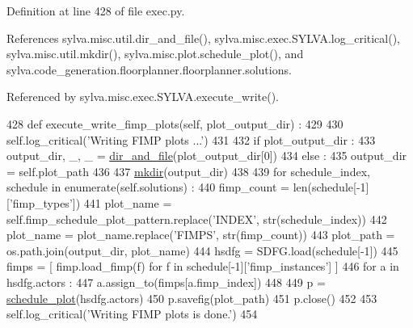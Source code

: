 Definition at line 428 of file exec.\+py.



References sylva.\+misc.\+util.\+dir\+\_\+and\+\_\+file(), sylva.\+misc.\+exec.\+S\+Y\+L\+V\+A.\+log\+\_\+critical(), sylva.\+misc.\+util.\+mkdir(), sylva.\+misc.\+plot.\+schedule\+\_\+plot(), and sylva.\+code\+\_\+generation.\+floorplanner.\+floorplanner.\+solutions.



Referenced by sylva.\+misc.\+exec.\+S\+Y\+L\+V\+A.\+execute\+\_\+write().


\begin{DoxyCode}
428   \textcolor{keyword}{def }execute\_write\_fimp\_plots(self, plot\_output\_dir) :
429 
430     self.log\_critical(\textcolor{stringliteral}{'Writing FIMP plots ...'})
431 
432     \textcolor{keywordflow}{if} plot\_output\_dir :
433       output\_dir, \_, \_ = \hyperlink{namespacesylva_1_1misc_1_1util_a0ce6d1d719234031353b60ac60f2af0d}{dir\_and\_file}(plot\_output\_dir[0])
434     \textcolor{keywordflow}{else} :
435       output\_dir = self.plot\_path
436 
437     \hyperlink{namespacesylva_1_1misc_1_1util_af426e429c40209bbb46e3a0e8f139a44}{mkdir}(output\_dir)
438 
439     \textcolor{keywordflow}{for} schedule\_index, schedule \textcolor{keywordflow}{in} enumerate(self.solutions) :
440       fimp\_count = len(schedule[-1][\textcolor{stringliteral}{'fimp\_types'}])
441       plot\_name = self.fimp\_schedule\_plot\_pattern.replace(\textcolor{stringliteral}{'INDEX'}, str(schedule\_index))
442       plot\_name = plot\_name.replace(\textcolor{stringliteral}{'FIMPS'}, str(fimp\_count))
443       plot\_path = os.path.join(output\_dir, plot\_name)
444       hsdfg = SDFG.load(schedule[-1])
445       fimps = [ fimp.load\_fimp(f) \textcolor{keywordflow}{for} f \textcolor{keywordflow}{in} schedule[-1][\textcolor{stringliteral}{'fimp\_instances'}] ]
446       \textcolor{keywordflow}{for} a \textcolor{keywordflow}{in} hsdfg.actors :
447         a.assign\_to(fimps[a.fimp\_index])
448 
449       p = \hyperlink{namespacesylva_1_1misc_1_1plot_a2937dd66c98822d9914353fc15105e14}{schedule\_plot}(hsdfg.actors)
450       p.savefig(plot\_path)
451       p.close()
452 
453     self.log\_critical(\textcolor{stringliteral}{'Writing FIMP plots is done.'})
454 
\end{DoxyCode}
\mbox{\label{classsylva_1_1misc_1_1exec_1_1_s_y_l_v_a_a696ca3640510ccc190d66581f982fb0a}} 
